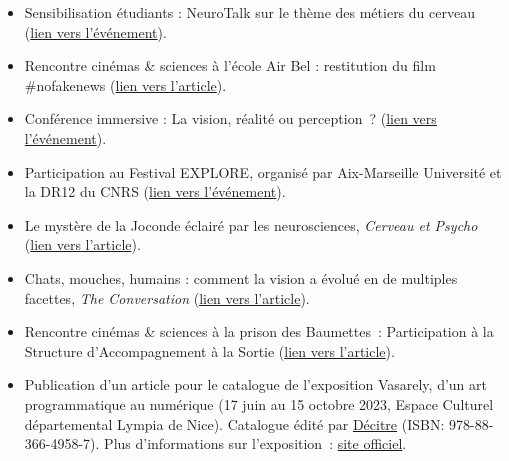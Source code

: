 \documentclass[10pt,french,a4paper,oneside]{article}%
\newcommand{\years}[1]{\marginpar{\textit{\scriptsize #1}}}
\begin{document}
\begin{itemize}
	\item Sensibilisation étudiants : \og{}NeuroTalk sur le thème des métiers du cerveau\fg{} (\href{https://laurentperrinet.github.io/post/2025-11-24_neurotalk/}{lien vers l'événement}). \years{2025}

	\item Rencontre cinémas \& sciences à l'école Air Bel : restitution du film \og{}\#nofakenews\fg{} (\href{https://laurentperrinet.github.io/post/2025-09-23_belair-nofakenews/}{lien vers l'article}). 
	
	\item Conférence immersive : \og{}La vision, réalité ou perception~?\fg{} (\href{https://laurentperrinet.github.io/talk/2025-06-12_explore-conference-immersive}{lien vers l'événement}).

	\item Participation au \og{}Festival EXPLORE\fg{}, organisé par Aix-Marseille Université et la DR12 du CNRS (\href{https://laurentperrinet.github.io/talk/2025-06-10_explore-cine-sciences}{lien vers l'événement}). 

	\item \og{}Le mystère de la Joconde éclairé par les neurosciences\fg{}, \textit{Cerveau et Psycho} (\href{https://laurentperrinet.github.io/post/2024-08-25-joconde/}{lien vers l'article}). \years{2024}

	\item \og{}Chats, mouches, humains : comment la vision a évolué en de multiples facettes\fg{}, \textit{The Conversation} (\href{https://laurentperrinet.github.io/publication/perrinet-24-yeux/}{lien vers l'article}). \years{2024}

    \item Rencontre cinémas \& sciences à la prison des Baumettes~: Participation à la \og Structure d'Accompagnement à la Sortie \fg{} (\href{https://laurentperrinet.github.io/post/2024-05-23-lieux-fictifs/}{lien vers l'article}).

    \item Publication d'un article pour le catalogue de l'exposition \og Vasarely, d'un art programmatique au numérique \fg{} (17 juin au 15 octobre 2023, Espace Culturel départemental Lympia de Nice). Catalogue édité par \href{https://www.decitre.fr/livres/vasarely-9788836649587.html}{Décitre} (ISBN: 978-88-366-4958-7). Plus d'informations sur l'exposition~: \href{https://www.departement06.fr/culture/vasarely-d-un-art-programmatique-au-numerique-13667.html}{site officiel}. \years{2023}


\end{itemize}
\end{document}

